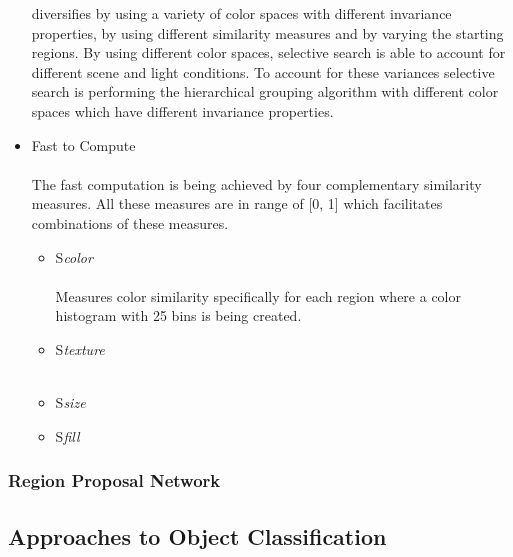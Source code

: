 \begin{itemize}
        diversifies by using a variety of color spaces with different invariance properties, by using different similarity measures and by
        varying the starting regions.  By using different color spaces, selective search is able to account for different scene and light
        conditions. To account for these variances selective search is performing the hierarchical grouping algorithm with different color
        spaces which have different invariance properties.
    \item Fast to Compute \\ \\
        The fast computation is being achieved by four complementary similarity measures. All these measures are in range of [0, 1] which
        facilitates combinations of these measures.
        \begin{itemize}
            \item \large{S}\emph{color} \\ \\
                Measures color similarity specifically for each region where a color histogram with 25 bins is being created. \\
            \item \large{S}\emph{texture} \\ \\

            \item \large{S}\emph{size}
            \item \large{S}\emph{fill}
        \end{itemize}
\end{itemize}

\subsubsection{Region Proposal Network}

\subsection{Approaches to Object Classification}

     
